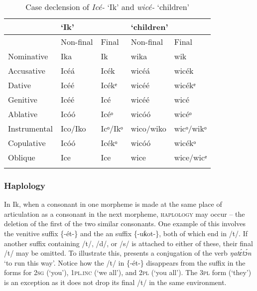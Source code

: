 \begin{table}
\caption{Case declension of \textit{Icé-} ‘Ik’ and \textit{wicé-} ‘children’}
\label{tab:phon:wice}


\begin{tabularx}{\textwidth}{XXXXX}
\lsptoprule

& \multicolumn{2}{X}{‘Ik’} & \multicolumn{2}{X}{‘children’}\\
\midrule
& Non-final & Final & Non-final & Final\\
\midrule
Nominative & Ika & Ik\ᵃ & wika & wik\ᵃ\\
Accusative & Icéá & Icék\ᵃ & wicéá & wicék\ᵃ\\
Dative & Icéé & Icékᵉ & wicéé & wicékᵉ\\
Genitive & Icéé & Icé & wicéé & wicé\\
Ablative & Icóó & Icéᵒ & wicóó & wicéᵒ\\
Instrumental & Ico/Iko & Icᵒ/Ikᵒ & wico/wiko & wicᵒ/wikᵒ\\
Copulative & Icóó & Icékᵒ & wicóó & wicékᵒ\\
Oblique & Ice & Ice & wice & wice/wicᵉ\\
\lspbottomrule
\end{tabularx}
\end{table}


\subsubsection{Haplology}\label{sec:2.4.2}

In Ik, when a consonant in one morpheme is made at the same place of articulation as a consonant in the next morpheme, \textsc{haplology} may occur – the deletion of the first of the two similar consonants. One example of this involves the venitive suffix \{-ét-\} and the an suffix \{-uƙot-\}, both of which end in /t/. If another suffix containing /t/, /d/, or /s/ is attached to either of these, their final /t/ may be omitted. To illustrate this,  presents a conjugation of the verb \textit{ŋat\'{ɛ}t\'{ɔ}n} ‘to run this way’. Notice how the /t/ in \{-ét-\} disappears from the suffix in the forms for \textsc{2sg} (‘you’), \textsc{1pl.inc} (‘we all’), and \textsc{2pl} (‘you all’). The 3\textsc{pl} form (‘they’) is an exception as it does not drop its final /t/ in the same environment.


